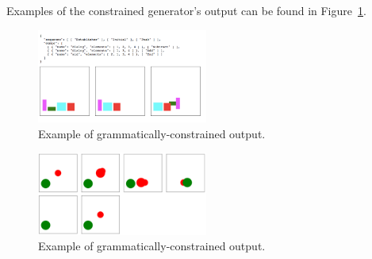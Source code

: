 Examples of the constrained generator's output can be found in
Figure~\ref{fig:outgood}.

\begin{figure}
\includegraphics[width=0.5\textwidth]{comicgen-output-constrained-1.png}
\caption{Example of grammatically-constrained output.}
\label{fig:outgood}
\end{figure}

\begin{figure}
\includegraphics[width=0.5\textwidth]{comicgen-output-4.png}
\caption{Example of grammatically-constrained output.}
\label{fig:redgreen}
\end{figure}



